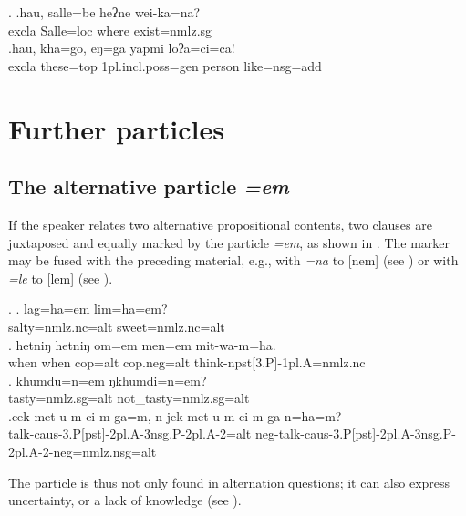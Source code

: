  \ex. \ag.hau,  salle=be        heʔne wei-ka=na?\\
 {\sc excla} Salle{\sc =loc} where exist{=nmlz.sg}\\
 \bg.hau,  kha=go, eŋ=ga  yapmi  loʔa=ci=ca!\\
 {\sc excla} these{\sc =top} {\sc 1pl.incl.poss=gen} person like{\sc =nsg=add}\\
 
\section{Further particles}\label{ptcl-further}
\subsection{The alternative particle \emph{=em}}\label{ptcl-alt}

If the speaker relates two alternative propositional contents, two clauses are juxtaposed and equally marked by the particle \emph{=em}, as shown in \Next. The marker may be fused with the preceding material, e.g., with  \emph{=na} to [nem] (see \Next[c]) or with \emph{=le} to [lem] (see \NNext[a]).
\largerpage

\ex. \ag. lag=ha=em lim=ha=em?\\
salty{\sc =nmlz.nc=alt} sweet{\sc =nmlz.nc=alt}\\
\bg. hetniŋ hetniŋ om=em men=em  mit-wa-m=ha.\\
when when	{\sc cop=alt} {\sc cop.neg=alt} think{\sc -npst[3.P]-1pl.A=nmlz.nc}\\
	\bg.   khumdu=n=em           ŋkhumdi=n=em?\\
tasty{\sc =nmlz.sg=alt} not\_tasty{\sc =nmlz.sg=alt}\\
	 
	\bg.cek-met-u-m-ci-m-ga=m,                                    n-jek-met-u-m-ci-m-ga-n=ha=m?\\
talk{\sc -caus-3.P[pst]-2pl.A-3nsg.P-2pl.A-2=alt}	{\sc neg-}talk{\sc -caus-3.P[pst]-2pl.A-3nsg.P-2pl.A-2-neg=nmlz.nsg=alt}\\
	 
 
 The  particle is thus not only found in alternation questions; it can also express uncertainty, or a lack of knowledge  (see \Next).
 
